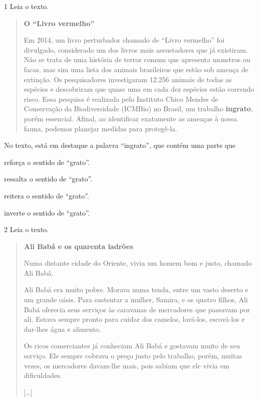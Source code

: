 \vspace*{-3.4cm}

\num{1} Leia o texto.

\begin{quote}
\textbf{O ``Livro vermelho''}

Em 2014, um livro perturbador chamado de ``Livro vermelho'' foi divulgado, considerado um dos livros mais assustadores que já existiram. Não se trata de uma história de terror comum que apresenta monstros ou facas, mas sim uma lista dos animais brasileiros que estão sob ameaça de extinção. Os pesquisadores investigaram 12.256 animais de todas as espécies e descobriram que quase uma em cada dez espécies estão correndo risco. Essa pesquisa é realizada pelo Instituto Chico Mendes de Conservação da Biodiversidade (ICMBio) no Brasil, um trabalho \textbf{ingrato}, porém essencial. Afinal, ao identificar exatamente as ameaças à nossa fauna, podemos planejar medidas para protegê-la.

\end{quote}

No texto, está em destaque a palavra ``ingrato'', que contém uma parte que

\begin{escolha}
\item reforça o sentido de ``grato''.

\item ressalta o sentido de ``grato''.

\item reitera o sentido de ``grato''.

\item inverte o sentido de ``grato''.
\end{escolha}

\num{2} Leia o texto.

\begin{quote}
\textbf{Ali Babá e os quarenta ladrões}

Numa distante cidade do Oriente, vivia um homem bom e justo, chamado Ali
Babá.

Ali Babá era muito pobre. Morava numa tenda, entre um vasto deserto e um
grande oásis. Para sustentar a mulher, Samira, e os quatro filhos, Ali
Babá oferecia seus serviços às caravanas de mercadores que passavam por
ali. Estava sempre pronto para cuidar dos camelos, lavá-los, escová-los
e dar-lhes água e alimento.

Os ricos comerciantes já conheciam Ali Babá e gostavam muito de seu
serviço. Ele sempre cobrava o preço justo pelo trabalho, porém, muitas
vezes, os mercadores davam-lhe mais, pois sabiam que ele vivia em
dificuldades.

{[}\ldots{}{]}

\end{quote}

